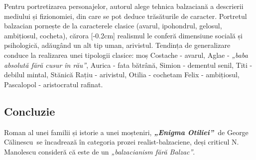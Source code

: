 \documentclass[
12pt,
a4paper
]{article}
\newcommand{\operatitle}{\textbf{\textit{„Enigma Otiliei”\ }}} %
\newcommand{\operaauthor}{George Călinescu\ } %
\begin{document}
Pentru portretizarea personajelor, autorul alege tehnica balzaciană a descrierii mediului și fizionomiei, din care se pot deduce trăsăturile de caracter. Portretul balzacian pornește de la caracterele clasice (avarul, ipohondrul, gelosul, ambițiosul, cocheta), cărora
[-0.2cm]
realismul le conferă dimensiune socială și psihologică, adăugând un alt tip uman, arivistul. Tendința de generalizare conduce la realizarea unei tipologii clasice: moș Costache - avarul, Aglae - \textit{„baba absolută fără cusur în rău”}, Aurica - fata bătrână, Simion - dementul senil, Titi - debilul mintal, Stănică Rațiu - arivistul, Otilia - cochetam Felix - ambițiosul, Pascalopol - aristocratul rafinat.

\subsection{Concluzie}

Roman al unei familii și istorie a unei moșteniri, \operatitle de \operaauthor se încadrează în categoria prozei realist-balzaciene, deși criticul N. Manolescu consideră că este de un \textit{„balzacianism fără Balzac”}.
\end{document}
